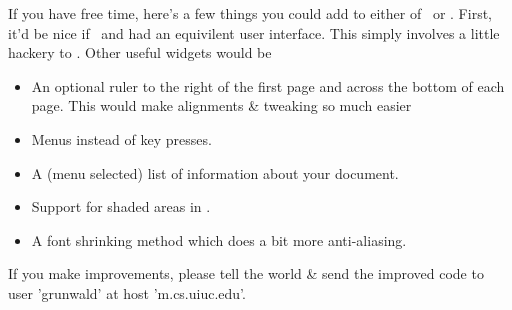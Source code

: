 If you have free time, here's a few things you could add to either of \texsun\ 
or \texx.
First, it'd be nice if \texx\ and \texsun had an equivilent user interface.
This simply involves a little hackery to \texx.
Other useful widgets would be
\begin{itemize}
\item	An optional ruler to the right of the first page and across the bottom
	of each page. This would make alignments \& tweaking so much easier
\item	Menus instead of key presses.
\item	A (menu selected) list of information about your document.
\item	Support for shaded areas in \texx.
\item	A font shrinking method which does a bit more anti-aliasing.
\end{itemize}

If you make improvements, please tell the world \& send the improved code to
user 'grunwald' at host 'm.cs.uiuc.edu'.
